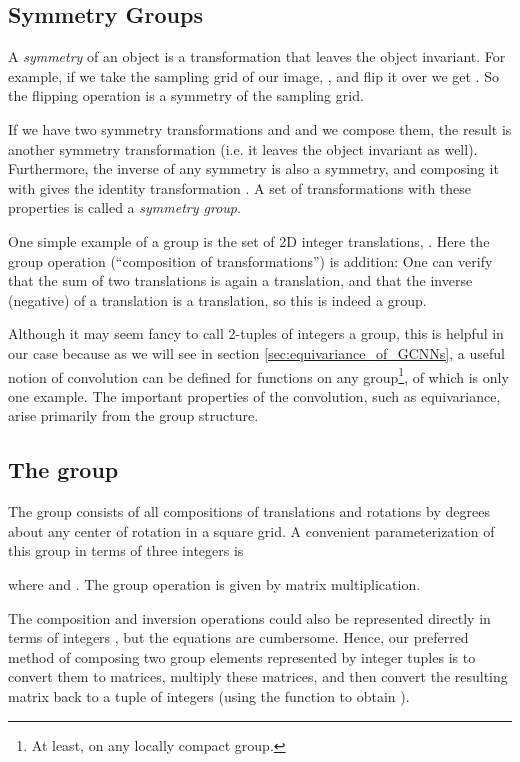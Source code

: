 \documentclass{article}
\begin{document}
\subsection{Symmetry Groups}

A \emph{symmetry} of an object is a transformation that leaves the object invariant.
For example, if we take the sampling grid of our image, , and flip it over we get .
So the flipping operation is a symmetry of the sampling grid.

If we have two symmetry transformations  and  and we compose them, the result  is another symmetry transformation (i.e. it leaves the object invariant as well).
Furthermore, the inverse  of any symmetry is also a symmetry, and composing it with  gives the identity transformation .
A set of transformations with these properties is called a \emph{symmetry group}.

One simple example of a group is the set of 2D integer translations, .
Here the group operation (``composition of transformations'') is addition: 
One can verify that the sum of two translations is again a translation, and that the inverse (negative) of a translation is a translation, so this is indeed a group.

Although it may seem fancy to call 2-tuples of integers a group, this is helpful in our case because as we will see in section \ref{sec:equivariance_of_GCNNs},
a useful notion of convolution can be defined for functions on any group\footnote{At least, on any locally compact group.}, of which  is only one example.
The important properties of the convolution, such as equivariance, arise primarily from the group structure.
 

\subsection{The group }
\label{sec:group_p4}

The group  consists of all compositions of translations and rotations by  degrees about any center of rotation in a square grid.
A convenient parameterization of this group in terms of three integers  is

where  and .
The group operation is given by matrix multiplication.

The composition and inversion operations could also be represented directly in terms of integers , but the equations are cumbersome.
Hence, our preferred method of composing two group elements represented by integer tuples is to convert them to matrices, multiply these matrices, and then convert the resulting matrix back to a tuple of integers (using the  function to obtain ).
\end{document}
